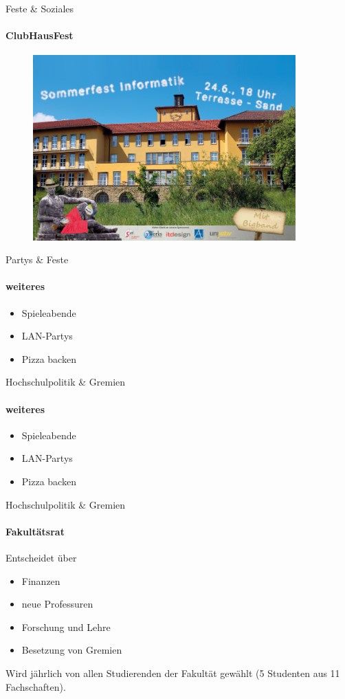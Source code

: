 \documentclass{beamer}
\begin{document}
	\begin{frame}{Feste \& Soziales}
		\framesubtitle{ClubHausFest}
		\begin{figure}
			\includegraphics[width=0.9\textwidth]{pictures/sommerfest.png}
		\end{figure}
	\end{frame}
	
	\begin{frame}{Partys \& Feste}
		\framesubtitle{weiteres}
		\begin{itemize}
			\item Spieleabende
			\item LAN-Partys
			\item Pizza backen
		\end{itemize}
	\end{frame}
	
	\begin{frame}{Hochschulpolitik \& Gremien}
		\framesubtitle{weiteres}
		\begin{itemize}
			\item Spieleabende
			\item LAN-Partys
			\item Pizza backen
		\end{itemize}
	\end{frame}
	
	\begin{frame}{Hochschulpolitik \& Gremien}
		\framesubtitle{Fakultätsrat}
	 	Entscheidet über
	 	\begin{itemize}
	 		\item Finanzen
	 		\item neue Professuren
	 		\item Forschung und Lehre
	 		\item Besetzung von Gremien
	 	\end{itemize}
	 	Wird jährlich von allen Studierenden der Fakultät gewählt (5 Studenten aus 11 Fachschaften).
	 \end{frame}
	
\end{document}
